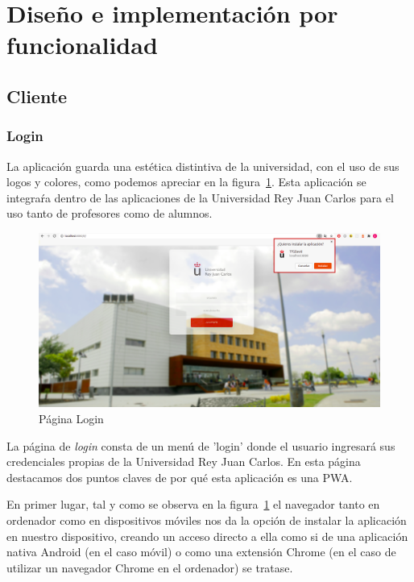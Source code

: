 \documentclass[a4paper, 12pt]{book}
\begin{document}
\section{Diseño e implementación por funcionalidad } 

\subsection{Cliente}

\subsubsection{Login}
	La aplicación guarda una estética distintiva de la universidad, con el uso de sus logos y colores, como podemos apreciar en la figura~\ref{fig:principalHome}. Esta aplicación se integraŕa dentro de las aplicaciones de la Universidad Rey Juan Carlos para el uso tanto de profesores como de alumnos.
	
	\begin{figure}[h!]
  	\centering
  	\includegraphics[width=16cm, keepaspectratio]{img/principalHome.png}
  	\caption{Página Login}\label{fig:principalHome}
	\end{figure}
	
La página de \textit{login} consta de un menú de 'login' donde el usuario ingresará sus credenciales propias de la Universidad Rey Juan Carlos. En esta página destacamos dos puntos claves de por qué esta aplicación es una PWA.
	
	En primer lugar, tal y como se observa en la figura~\ref{fig:principalHome} el navegador tanto en ordenador como en dispositivos móviles nos da la opción de instalar la aplicación en nuestro dispositivo, creando un acceso directo a ella como si de una aplicación nativa Android (en el caso móvil) o como una extensión Chrome (en el caso de utilizar un navegador Chrome en el ordenador) se tratase.
\end{document}
